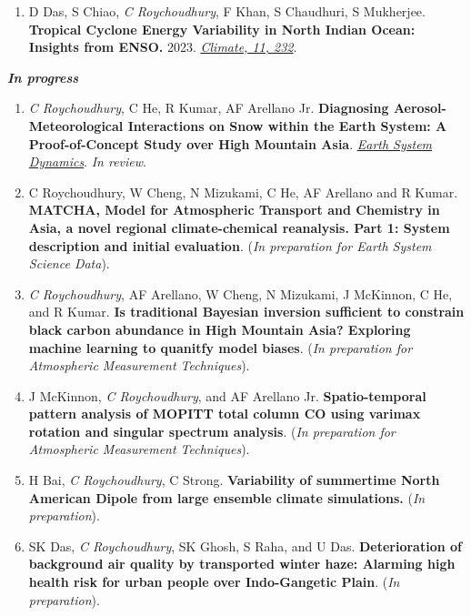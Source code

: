 \documentclass[margin,line]{resume}
\begin{document}
\begin{resume}
\begin{enumerate}[topsep=1pt, partopsep=1pt, itemsep=0.5pt, parsep=0.1pt, leftmargin=15pt,label=\arabic*.]
			\item D Das, S Chiao, \textit{C Roychoudhury}, F Khan, S Chaudhuri, S Mukherjee. \textbf{Tropical Cyclone Energy Variability in North Indian Ocean: Insights from ENSO.} 2023.
			\href{https://www.mdpi.com/2225-1154/11/12/232}{\textit{Climate, 11, 232}}.
			
		\end{enumerate}
	
		\textbf{\emph{\textcolor{sep}{\textbf{In progress}}}}
			\begin{enumerate}[topsep=1pt, partopsep=1pt, itemsep=0.5pt, parsep=0.1pt, leftmargin=15pt,label=\arabic*.]
				
			\item \textit{C Roychoudhury}, C He, R Kumar, AF Arellano Jr. \textbf{Diagnosing Aerosol-Meteorological Interactions on Snow within the Earth System: A Proof-of-Concept Study over High Mountain Asia}.  \emph{\href{https://doi.org/10.5194/egusphere-2024-2298}{Earth System Dynamics}}. \textit{In review}.
				
			\item C Roychoudhury, W Cheng, N Mizukami, C He, AF Arellano and R Kumar. \textbf{MATCHA, Model for Atmospheric Transport and Chemistry in Asia, a novel regional climate-chemical reanalysis. Part 1: System description and initial evaluation}. (\textit{In preparation for Earth System Science Data}).
			
			\item \textit{C Roychoudhury}, AF Arellano, W Cheng, N Mizukami, J McKinnon, C He, and R Kumar. \textbf{Is traditional Bayesian inversion sufficient to constrain black carbon abundance in High Mountain Asia? Exploring machine learning to quanitfy model biases}.  (\textit{In preparation for Atmospheric Measurement Techniques}).
			
			\item J McKinnon, \textit{C Roychoudhury}, and AF Arellano Jr. \textbf{Spatio-temporal pattern analysis of MOPITT total column CO
			using varimax rotation and singular spectrum analysis}. (\textit{In preparation for Atmospheric Measurement Techniques}).
			
			\item H Bai, \textit{C Roychoudhury}, C Strong. \textbf{Variability of summertime North American Dipole from large ensemble climate simulations.} (\emph{In preparation}).
			
			\item   SK Das, \textit{C Roychoudhury}, SK Ghosh, S Raha, and U Das.
			\textbf{ Deterioration of background air quality by transported winter haze: Alarming high health risk for urban people over Indo-Gangetic Plain}. (\emph{In preparation}).
			

\end{enumerate}
\end{resume}
\end{document}
